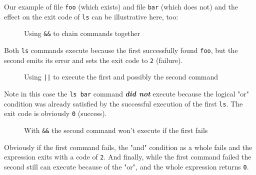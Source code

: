 \documentclass[10pt,american,]{book}
\newenvironment{Shaded}{\begin{snugshade}}{\end{snugshade}}
\newcommand{\KeywordTok}[1]{\textcolor[rgb]{0.13,0.29,0.53}{\textbf{{#1}}}}
\newcommand{\OtherTok}[1]{\textcolor[rgb]{0.56,0.35,0.01}{{#1}}}
\newcommand{\NormalTok}[1]{{#1}}
\numberwithin{figure}{chapter}
\DeclareRobustCommand{\drcap}[1]{\begin{figure}[H]\caption{#1}\end{figure}}
\renewcommand{\KeywordTok}[1]{{#1}}
\renewcommand{\OtherTok}[1]{{#1}}
\renewcommand{\NormalTok}[1]{{#1}}
\begin{document}
Our example of file \texttt{foo} (which exists) and file \texttt{bar}
(which does not) and the effect on the exit code of \texttt{ls} can be
illustrative here, too:

\drcap{Using \texttt{\&}\texttt{\&} to chain commands together}

\begin{Shaded}
\end{Shaded}

Both \texttt{ls} commands execute because the first successfully found
\texttt{foo}, but the second emits its error and sets the exit code to
\texttt{2} (failure).

\drcap{Using \texttt{||} to execute the first and possibly the second command}

\begin{Shaded}
\end{Shaded}

Note in this case the \texttt{ls\ bar} command \textbf{\emph{did not}}
execute because the logical "or" condition was already satisfied by the
successful execution of the first \texttt{ls}. The exit code is
obviously \texttt{0} (success).

\drcap{With \texttt{\&}\texttt{\&} the second command won't execute if the first fails}

\begin{Shaded}
\end{Shaded}

Obviously if the first command fails, the "and" condition as a whole
fails and the expression exits with a code of \texttt{2}. And finally,
while the first command failed the second still can execute because of
the "or", and the whole expression returns \texttt{0}.
\end{document}
